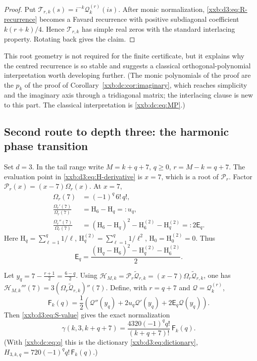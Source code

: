 \documentclass[11pt,a4paper]{article}
\numberwithin{equation}{section}
\theoremstyle{definition}
\theoremstyle{remark}
\theoremstyle{plain}
\begin{document}
\begin{proof}
Put $\mathcal T_{r,k}(s)=i^{-k}\mathcal Q_k^{(r)}(is)$.  After monic
normalization, \eqref{xxb:d3:eq:R-recurrence} becomes a Favard recurrence with
positive subdiagonal coefficient $k(r+k)/4$.  Hence $\mathcal T_{r,k}$ has
simple real zeros with the standard interlacing property.  Rotating back gives
the claim.
\end{proof}

This root geometry is not required for the finite certificate, but it explains
why the centred recurrence is so stable and suggests a classical
orthogonal-polynomial interpretation worth developing further.  (The monic
polynomials of the proof are the $p_k$ of the proof of
Corollary~\ref{xxb:dc:cor:imaginary}, which reaches simplicity and the
imaginary axis through a tridiagonal matrix; the interlacing clause is new to
this part.  The classical interpretation is \eqref{xxb:dc:eq:MP}.)

\subsection{Second route to depth three: the harmonic phase transition}\label{xxb:d3:sec:harmonic}

Set $d=3$.  In the tail range write
$M=k+q+7$, $q\geq0$, $r=M-k=q+7$.
The evaluation point in \eqref{xxb:d3:eq:H-derivative} is $x=7$, which is a
root of $\mathcal P_r$.  Factor $\mathcal P_r(x)=(x-7)\Omega_r(x)$.
At $x=7$,
\begin{align}
 \Omega_r(7)&=(-1)^q\,6!\,q!,\label{xxb:d3:eq:S-value}\\
 \frac{\Omega_r'(7)}{\Omega_r(7)}&=\mathrm H_6-\mathrm H_q=:u_q,\label{xxb:d3:eq:S-log1}\\
 \frac{\Omega_r''(7)}{\Omega_r(7)}
 &=(\mathrm H_6-\mathrm H_q)^2-\mathrm H_6^{(2)}-\mathrm H_q^{(2)}=:2\mathsf E_q.\label{xxb:d3:eq:S-log2}
\end{align}
Here $\mathrm H_q=\sum_{\ell=1}^{q}1/\ell$,
$\mathrm H_q^{(2)}=\sum_{\ell=1}^{q}1/\ell^2$, $\mathrm H_0=\mathrm H_0^{(2)}=0$.
Thus
\begin{equation}
 \label{xxb:d3:eq:E-def}
 \mathsf E_q=\frac{(\mathrm H_q-\mathrm H_6)^2-\mathrm H_q^{(2)}-\mathrm H_6^{(2)}}{2}.
\end{equation}

Let $y_q=7-\frac{r+1}{2}=\frac{6-q}{2}$.  Using
$\mathcal H_{M,k}=\mathcal P_r\widetilde{\mathcal Q}_{r,k}
=(x-7)\Omega_r\widetilde{\mathcal Q}_{r,k}$, one has
$\mathcal H_{M,k}'''(7)=3(\Omega_r\widetilde{\mathcal Q}_{r,k})''(7)$.
Define, with $r=q+7$ and $\mathcal Q=\mathcal Q_k^{(r)}$,
\begin{equation}
 \label{xxb:d3:eq:F-def}
 \mathsf F_k(q)=\frac12\left(
 \mathcal Q''(y_q)+2u_q\mathcal Q'(y_q)+2\mathsf E_q\mathcal Q(y_q)
 \right).
\end{equation}
Then \eqref{xxb:d3:eq:S-value} gives the exact normalization
\begin{equation}
 \label{xxb:d3:eq:gamma-F}
 \boxed{
 \gamma(k,3,k+q+7)
 =\frac{4320(-1)^qq!}{(k+q+7)!}\,\mathsf F_k(q).}
\end{equation}
(With \eqref{xxb:dc:eq:q} this is the dictionary \eqref{xxb:d3:eq:dictionary},
$H_{3,k,q}=720(-1)^qq!\,\mathsf F_k(q)$.)
\end{document}
